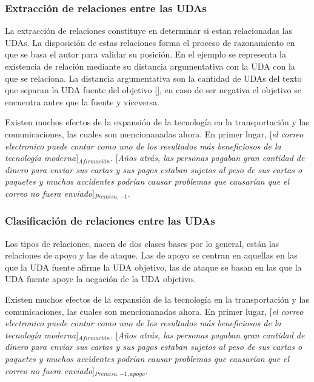 \subsubsection{Extracción de relaciones entre las UDAs}

La extracción de relaciones constituye en determinar si estan relacionadas las UDAs. La disposición de estas
relaciones forma el proceso de razonamiento en que se basa el autor para validar su posición. En el ejemplo 
se representa la existencia de relación mediante su distancia argumentativa con la UDA con la que se relaciona.
La distancia argumentativa son la cantidad de UDAs del texto que separan la UDA fuente del objetivo [\cite{galassi2018argumentative}], 
en caso de ser negativa el objetivo se encuentra antes que la fuente y viceversa.

\begin{adjustwidth}{25pt}{25pt}
    Existen muchos efectos de la expansión de la tecnología en la transportación y las comunicaciones, 
    las cuales son mencionanadas ahora. En primer lugar, [\emph{el correo electronico puede contar como uno de los resultados
    más beneficiosos de la tecnología moderna}]$_{Afirmación}$. [\emph{Años atrás, las personas pagaban gran cantidad de dinero para 
    enviar sus cartas y sus pagos estaban sujetos al peso de sus cartas o paquetes y muchos accidentes podrían 
    causar problemas que causarían que el correo no fuera enviado}]$_{Premisa, -1}$.
\end{adjustwidth}

\subsubsection{Clasificación de relaciones entre las UDAs}

Los tipos de relaciones, nacen de dos clases bases por lo general, están las relaciones de apoyo y las de ataque.
Las de apoyo se centran en aquellas en las que la UDA fuente afirme la UDA objetivo, las de ataque se basan en 
las que la UDA fuente apoye la negación de la UDA objetivo.

\begin{adjustwidth}{25pt}{25pt}
    Existen muchos efectos de la expansión de la tecnología en la transportación y las comunicaciones, 
    las cuales son mencionanadas ahora. En primer lugar, [\emph{el correo electronico puede contar como uno de los resultados
    más beneficiosos de la tecnología moderna}]$_{Afirmación}$. [\emph{Años atrás, las personas pagaban gran cantidad de dinero para 
    enviar sus cartas y sus pagos estaban sujetos al peso de sus cartas o paquetes y muchos accidentes podrían 
    causar problemas que causarían que el correo no fuera enviado}]$_{Premisa, -1, apoyo}$.
\end{adjustwidth}

